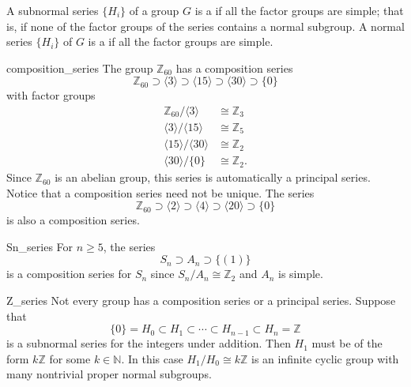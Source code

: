 A subnormal series $\{ H_i \}$ of a group $G$ is a  if all the factor groups are 
simple; that is, if none of the factor groups of the series contains a
normal subgroup. A normal series $\{ H_i \}$ of $G$ is a  if all the factor groups 
are simple.  
 
 
 
\begin{example}{composition_series}
The group ${\mathbb Z}_{60}$ has  a composition series 
\[
{\mathbb Z}_{60} \supset \langle 3 \rangle \supset  \langle 15 \rangle
\supset \langle 30 \rangle  \supset \{ 0 \}
\]
with factor groups
\begin{align*}
{\mathbb Z}_{60} / \langle 3 \rangle & \cong  {\mathbb Z}_{3} \\
\langle 3 \rangle / \langle 15 \rangle & \cong  {\mathbb Z}_{5} \\
\langle 15 \rangle / \langle 30 \rangle & \cong  {\mathbb Z}_{2} \\
\langle 30 \rangle / \{ 0 \} & \cong  {\mathbb Z}_2.
\end{align*}
Since ${\mathbb Z}_{60}$ is an abelian group, this series is
automatically a principal series. Notice that a composition series
need not be unique.  The series 
\[
{\mathbb Z}_{60} \supset \langle 2 \rangle \supset \langle 4 \rangle 
\supset  \langle 20 \rangle \supset \{ 0 \}
\]
is also a composition series.
\end{example}
 
 
 
\begin{example}{Sn_series}
For $n \geq 5$, the series
\[
S_n \supset A_n \supset \{ (1) \}
\]
is a composition series for $S_n$ since $S_n / A_n \cong {\mathbb Z}_2$
and $A_n$ is simple.
\end{example}
 
 
 
\begin{example}{Z_series}
Not every group has a composition series or a principal series.
Suppose that 
\[
\{ 0 \} = H_0 \subset H_1 \subset \cdots \subset H_{n-1}
\subset H_n = {\mathbb Z}
\]
is a subnormal series for the integers under addition. Then $H_1$ must
be of the form $k {\mathbb Z}$ for some $k \in {\mathbb N}$. In this case
$H_1 / H_0 \cong k {\mathbb Z}$ is an infinite cyclic group with many
nontrivial proper normal subgroups. 
\end{example}

